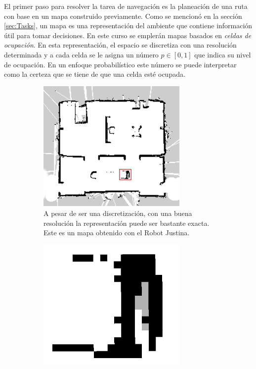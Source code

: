 \documentclass[letterpaper,12pt]{article}
\begin{document}
El primer paso para resolver la tarea de navegación es la planeación de una ruta con base en un mapa construido previamente. Como se mencionó en la sección \ref{sec:Tasks}, un mapa es una representación del ambiente que contiene información útil para tomar decisiones. En este curso se emplerán mapas basados en \textit{celdas de ocupación}. En esta representación, el espacio se discretiza con una resolución determinada y a cada celda se le asigna un número $p\in[0,1]$ que indica su nivel de ocupación. En un enfoque probabilístico este número se puede interpretar como la certeza que se tiene de que una celda esté ocupada. 
\begin{figure}
  \centering
  \begin{subfigure}{0.4\textwidth}
    \centering
    \includegraphics[width=0.8\textwidth]{Figures/OccupancyGrid.png}
    \caption{A pesar de ser una discretización, con una buena resolución la representación puede ser bastante exacta. Este es un mapa obtenido con el Robot Justina.}
  \end{subfigure}
  \hspace{0.05\textwidth}
  \begin{subfigure}{0.4\textwidth}
    \centering
    \includegraphics[width=0.8\textwidth]{Figures/UniversumZoom.png}

\end{subfigure}
\end{figure}
\end{document}
